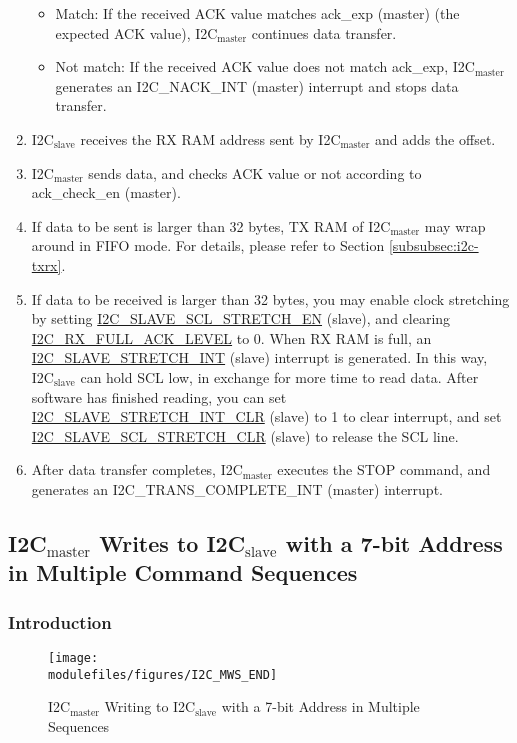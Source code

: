 \documentclass[main\_\_EN.tex]{subfiles}
\begin{document}
\begin{enumerate}
\begin{itemize}
\item Match: If the received ACK value matches ack\_exp (master) (the expected ACK value), I2C$_\text{master}$ continues data transfer.
\item Not match: If the received ACK value does not match ack\_exp, I2C$_\text{master}$ generates an I2C\_NACK\_INT (master) interrupt and stops data transfer.
\end{itemize}
\item I2C$_\text{slave}$ receives the RX RAM address sent by I2C$_\text{master}$ and adds the offset.

\item I2C$_\text{master}$ sends data, and checks ACK value or not according to ack\_check\_en (master).
\item If data to be sent is larger than 32 bytes, TX RAM of I2C$_\text{master}$ may wrap around in FIFO mode. For details, please refer to Section \ref{subsubsec:i2c-txrx}.
\item If data to be received is larger than 32 bytes, you may enable clock stretching by setting \hyperref[fielddesc:I2CSLAVESCLSTRETCHEN]{I2C\_SLAVE\_SCL\_STRETCH\_EN} (slave), and clearing \hyperref[fielddesc:I2CRXFULLACKLEVEL]{I2C\_RX\_FULL\_ACK\_LEVEL} to 0. When RX RAM is full, an \hyperref[int:i2c-slave-stretch]{I2C\_SLAVE\_STRETCH\_INT} (slave) interrupt is generated. In this way, I2C$_\text{slave}$ can hold SCL low, in exchange for more time to read data. After software has finished reading, you can set \hyperref[fielddesc:I2CSLAVESTRETCHINTCLR]{I2C\_SLAVE\_STRETCH\_INT\_CLR} (slave) to 1 to clear interrupt, and set \hyperref[fielddesc:I2CSLAVESCLSTRETCHCLR]{I2C\_SLAVE\_SCL\_STRETCH\_CLR} (slave) to release the SCL line.
\item After data transfer completes, I2C$_\text{master}$ executes the STOP command, and generates an I2C\_TRANS\_COMPLETE\_INT (master) interrupt.

\end{enumerate}

\subsection{\texorpdfstring{I2C$_\text{master}$ Writes to I2C$_\text{slave}$ with a 7-bit Address in Multiple Command Sequences}{I2C master Writes to I2C slave with a 7-bit Address in Multiple Command Sequences}}
\subsubsection{Introduction}
\begin{figure}[H]
    \centering
    \texttt{[image: \\modulefiles/figures/I2C\_MWS\_END]}    \caption{I2C$_\text{master}$ Writing to I2C$_\text{slave}$ with a 7-bit Address in Multiple Sequences}
    \label{fig:i2c-mws7-multiple}
\end{figure}
\end{document}
